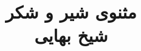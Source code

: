 \documentclass[14pt,b5paper]{article}
\begin{document}
\title{\Huge مثنوی شیر و شکر \\
شیخ بهایی}
\author{ }
\date{ }
\maketitle
\newpage
\tableofcontents
\newpage

\newpage

\newpage

\newpage

\newpage

\newpage

\newpage

\newpage
\end{document}
